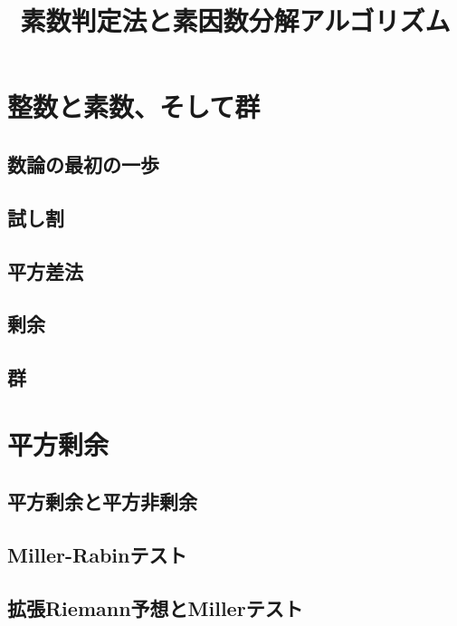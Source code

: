 
\title{素数判定法と素因数分解アルゴリズム}
\author{}
\date{}
\makeindex

\setcounter{notesNum}{1}
\maketitle
\begin{multicols}{2}
\setcounter{tocdepth}{2}
\tableofcontents
\end{multicols}
\newpage

\section{整数と素数、そして群}
\subsection{数論の最初の一歩}

\subsection{試し割}

\subsection{平方差法}

\subsection{剰余}

\subsection{群}


\section{平方剰余}
\subsection{平方剰余と平方非剰余}

\subsection{Miller-Rabinテスト}

\subsection{拡張Riemann予想とMillerテスト}


\newpage
\printindex



